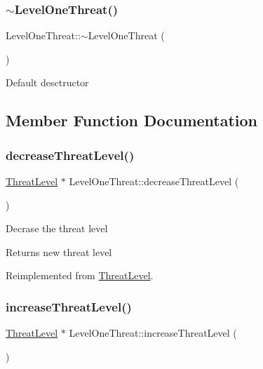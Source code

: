 \subsubsection{\texorpdfstring{$\sim$\+Level\+One\+Threat()}{~LevelOneThreat()}}
{\footnotesize\ttfamily Level\+One\+Threat\+::$\sim$\+Level\+One\+Threat (\begin{DoxyParamCaption}{ }\end{DoxyParamCaption})}

Default desctructor 

\subsection{Member Function Documentation}
\mbox{\label{classLevelOneThreat_a9a2899ac02e075905671ea03374cd561}} 
\subsubsection{\texorpdfstring{decrease\+Threat\+Level()}{decreaseThreatLevel()}}
{\footnotesize\ttfamily \hyperlink{classThreatLevel}{Threat\+Level} $\ast$ Level\+One\+Threat\+::decrease\+Threat\+Level (\begin{DoxyParamCaption}{ }\end{DoxyParamCaption})\hspace{0.3cm}{\ttfamily [virtual]}}

Decrase the threat level \begin{DoxyReturn}{Returns}
new threat level 
\end{DoxyReturn}


Reimplemented from \hyperlink{classThreatLevel_a3545ec161fbe4c01beafb9b43624c7e8}{Threat\+Level}.

\mbox{\label{classLevelOneThreat_afc68f742f1101cb8d533d8cec21bac3f}} 
\subsubsection{\texorpdfstring{increase\+Threat\+Level()}{increaseThreatLevel()}}
{\footnotesize\ttfamily \hyperlink{classThreatLevel}{Threat\+Level} $\ast$ Level\+One\+Threat\+::increase\+Threat\+Level (\begin{DoxyParamCaption}{ }\end{DoxyParamCaption})\hspace{0.3cm}{\ttfamily [virtual]}}

